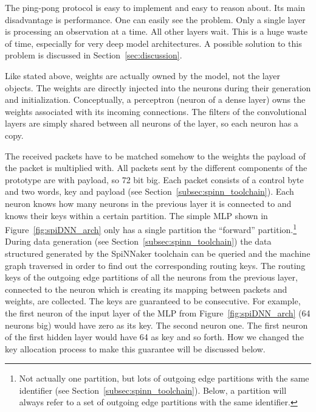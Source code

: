 \documentclass[]{article}
\begin{document}
The ping-pong protocol is easy to implement and easy to reason about.
Its main disadvantage is performance.
One can easily see the problem.
Only a single layer is processing an observation at a time.
All other layers wait.
This is a huge waste of time, especially for very deep model
architectures.
A possible solution to this problem is discussed in
Section~\ref{sec:discussion}.

Like stated above, weights are actually owned by the model, not
the layer objects.
The weights are directly injected into the neurons during their
generation and initialization.
Conceptually, a perceptron (neuron of a dense layer) owns the weights
associated with its incoming connections.
The filters of the convolutional layers are simply shared between
all neurons of the layer, so each neuron has a copy.

The received packets have to be matched somehow to the weights
the payload of the packet is multiplied with.
All packets sent by the different components of the prototype are
with payload, so 72 bit big.
Each packet consists of a control byte and two words, key and payload
(see Section~\ref{subsec:spinn_toolchain}).
Each neuron knows how many neurons in the previous layer it is
connected to and knows their keys within a certain partition.
The simple MLP shown in Figure~\ref{fig:spiDNN_arch} only has a
single partition the ``forward'' partition.\footnote{Not actually one
  partition, but lots of outgoing edge partitions with the same
  identifier (see Section~\ref{subsec:spinn_toolchain}).
  Below, a partition will always refer to a set of outgoing edge
  partitions with the same identifier.}
During data generation (see Section~\ref{subsec:spinn_toolchain})
the data structured generated by the SpiNNaker toolchain can be
queried and the machine graph traversed in order to find out the
corresponding routing keys.
The routing keys of the outgoing edge partitions of all the neurons
from the previous layer, connected to the neuron which is creating its
mapping between packets and weights, are collected.
The keys are guaranteed to be consecutive.
For example, the first neuron of the input layer of the MLP from
Figure~\ref{fig:spiDNN_arch} (64 neurons big) would have zero as its
key.
The second neuron one.
The first neuron of the first hidden layer would have 64 as key and so
forth.
How we changed the key allocation process to make this guarantee will
be discussed below.
\end{document}
